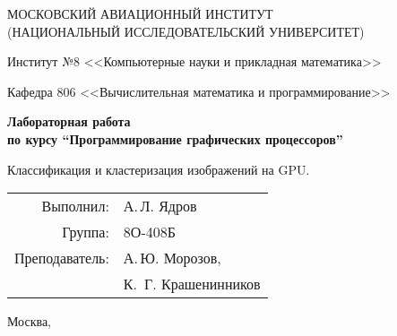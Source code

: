 \begin{titlepage}
\begin{center}
\large
МОСКОВСКИЙ АВИАЦИОННЫЙ ИНСТИТУТ\\ (НАЦИОНАЛЬНЫЙ ИССЛЕДОВАТЕЛЬСКИЙ УНИВЕРСИТЕТ)

\vspace{20pt}

Институт №8 <<Компьютерные науки и прикладная математика>>

Кафедра 806 <<Вычислительная математика и программирование>>
\end{center}

\vspace{60pt}

\begin{center}
\bfseries
\large
Лабораторная работа  \\по курсу \enquote{Программирование графических процессоров}

\vspace{54pt}

Классификация и кластеризация изображений на GPU.
\end{center}

\vfill

\begin{flushright}
\large
\begin{tabular}{rl}
Выполнил: & А.\,Л. Ядров \\
Группа: & 8О-408Б \\
Преподаватель: & А.\,Ю. Морозов, \\
& К.\, Г. Крашенинников
\end{tabular}
\end{flushright}

\vspace{92pt}

\begin{center}
\large
Москва, \the\year
\end{center}
\end{titlepage}

\pagebreak
